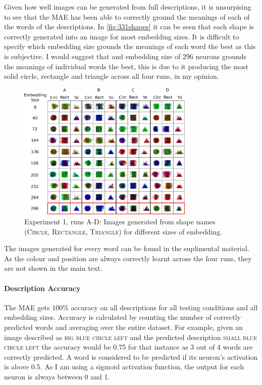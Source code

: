 
Given how well images can be generated from full descriptions, it is unsurpising to see that the MAE has been able to correctly ground the meanings of each of the words of the descriptions. In \autoref{fig:331shapes} it can be seen that each shape is correctly generated into an image for most embedding sizes. It is difficult to specify which embedding size grounds the meanings of each word the best as this is subjective. I would suggest that and embedding size of 296 neurons grounds the meanings of individual words the best, this is due to it producing the most solid circle, rectangle and triangle across all four runs, in my opinion. 

\begin{figure}[h]
\centering
\includegraphics[width=0.75\textwidth]{Figs/shapes/shapes331.png}
\caption{Experiment 1, runs A-D:  Images generated from shape names (\textsc{Circle, Rectangle, Triangle}) for different sizes of embedding.}
\label{fig:331shapes}
\end{figure}

The images generated for every word can be found in the suplimental material. As the colour and position are always  correctly learnt across the four runs, they are not shown in the main text.



\paragraph{Description Accuracy}
The MAE gets 100\% accuracy on all descriptions for all testing conditions and all embedding sizes. Accuracy is calculated by counting the number of correctly predicted words and averaging over the entire dataset. For example, given an image described as \textsc{big blue circle left} and the predicted description \textsc{small blue circle left} the accuracy would be 0.75 for that instance as 3 out of 4 words are correctly predicted. A word is considered to be predicted if its neuron's activation is above 0.5. As I am using a sigmoid activation function, the output for each neuron is always between 0 and 1.


